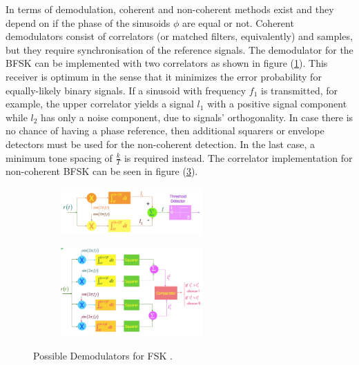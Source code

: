 \documentclass[12pt,a4paper,openright]{article}
\begin{document}
In terms of demodulation, coherent and non-coherent methods exist and they depend on if the phase of the sinusoids $\phi$ are equal or not. Coherent demodulators consist of correlators (or matched filters, equivalently) and samples, but they require  synchronisation of the reference signals. The demodulator for the BFSK can be implemented with two correlators as shown in figure (\ref{fig:FSKdemcoherent}). This receiver is optimum in the sense that it minimizes the error probability for equally-likely binary signals. If a sinusoid with frequency $f_1$ is transmitted, for example, the upper correlator yields a signal $l_1$ with a positive signal component while $l_2$ has only a noise component, due to signals’ orthogonality.
  In case there is no chance of having a phase reference, then additional squarers or envelope detectors must be used for the non-coherent detection. In the last case, a minimum tone spacing of $\frac{k}{T}$ is required instead. The correlator implementation for non-coherent BFSK can be seen in figure (\ref{fig:FSKdemNoncoherent}).

 \begin{figure}[h]
 \centering
\begin{subfigure}[h]{0.9\textwidth}
 \centering
    \includegraphics[width=0.6\textwidth]{fskdem1.pdf}
    \label{fig:FSKdemcoherent}

\end{subfigure}
\quad

\begin{subfigure}[h]{0.9\textwidth}
 \centering
    \includegraphics[width=0.6\textwidth]{fskdem2.pdf}
    \label{fig:FSKdemNoncoherent}
    \end{subfigure}
    \caption{Possible Demodulators for FSK \protect\cite{DigModTech}.}
\end{figure}
\end{document}
